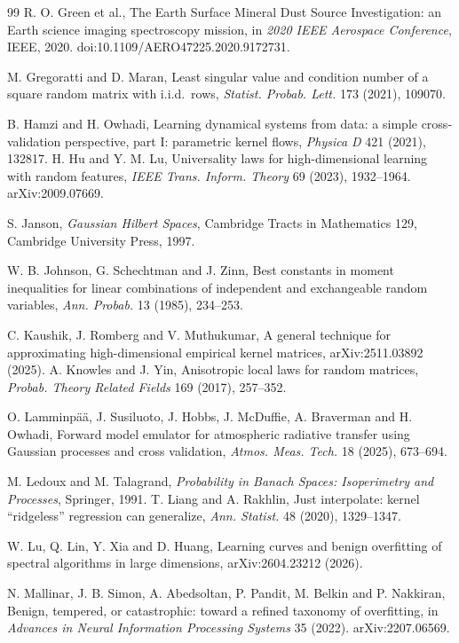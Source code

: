 \documentclass[11pt]{article}
\theoremstyle{definition}
\begin{document}
\begin{thebibliography}{99}
 R. O. Green et al., The Earth Surface Mineral Dust Source Investigation: an Earth
science imaging spectroscopy mission, in \emph{2020 IEEE Aerospace Conference}, IEEE, 2020.
doi:10.1109/AERO47225.2020.9172731.

 M. Gregoratti and D. Maran, Least singular value and condition number of a
square random matrix with i.i.d.\ rows, \emph{Statist. Probab. Lett.} 173 (2021), 109070.


 B. Hamzi and H. Owhadi, Learning dynamical systems from data: a simple cross-validation perspective, part I: parametric kernel flows, \emph{Physica D} 421 (2021), 132817.
 H. Hu and Y. M. Lu, Universality laws for high-dimensional learning with random
features, \emph{IEEE Trans. Inform. Theory} 69 (2023), 1932--1964. arXiv:2009.07669.


 S. Janson, \emph{Gaussian Hilbert Spaces}, Cambridge Tracts in Mathematics 129, Cambridge University Press, 1997.

 W. B. Johnson, G. Schechtman and J. Zinn, Best constants in moment inequalities for linear combinations of independent and exchangeable random variables, \emph{Ann. Probab.} 13 (1985), 234--253.

 C. Kaushik, J. Romberg and V. Muthukumar, A general technique for approximating high-dimensional empirical kernel matrices, arXiv:2511.03892 (2025).
 A. Knowles and J. Yin, Anisotropic local laws for random matrices,
\emph{Probab. Theory Related Fields} 169 (2017), 257--352.

 O. Lamminp\"a\"a, J. Susiluoto, J. Hobbs, J. McDuffie, A. Braverman and
H. Owhadi, Forward model emulator for atmospheric radiative transfer using Gaussian processes and
cross validation, \emph{Atmos. Meas. Tech.} 18 (2025), 673--694.


 M. Ledoux and M. Talagrand, \emph{Probability in Banach Spaces: Isoperimetry and Processes}, Springer, 1991.
 T. Liang and A. Rakhlin, Just interpolate: kernel ``ridgeless'' regression
can generalize, \emph{Ann. Statist.} 48 (2020), 1329--1347.

 W. Lu, Q. Lin, Y. Xia and D. Huang, Learning curves and benign overfitting
of spectral algorithms in large dimensions, arXiv:2604.23212 (2026).

 N. Mallinar, J. B. Simon, A. Abedsoltan, P. Pandit, M. Belkin and P. Nakkiran,
Benign, tempered, or catastrophic: toward a refined taxonomy of overfitting, in \emph{Advances in
Neural Information Processing Systems} 35 (2022). arXiv:2207.06569.


\end{thebibliography}
\end{document}
